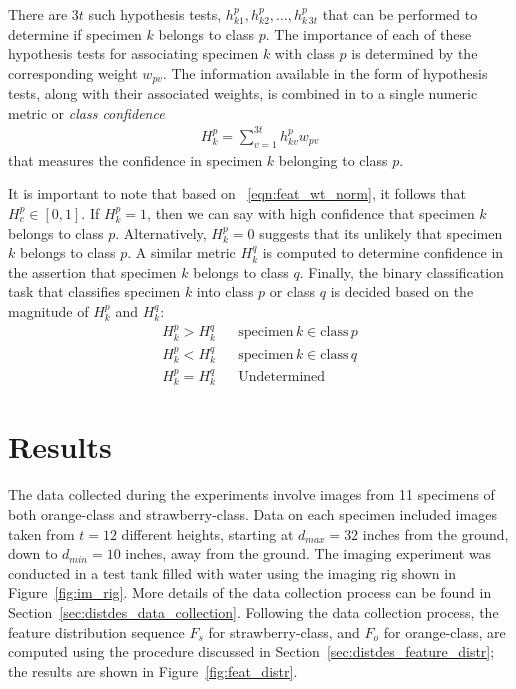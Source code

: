 There are $3t$ such hypothesis tests, $h^p_{k1}, h^p_{k2},\ldots, h^p_{k\, 3t}$ that can be performed to determine if specimen $k$ belongs to class $p$.
The importance of each of these hypothesis tests for associating specimen $k$ with class $p$ is determined by the corresponding weight $w_{pv}$. The information available in the form of hypothesis tests, along with their associated weights, is combined in to a single numeric metric or \emph{class confidence} 
%
\begin{align} \label{eqn:numeric_class_metric}
 H^p_k=\sum_{v=1}^{3t} h^p_{kv} w_{pv} 
\end{align}
%
that measures the confidence in specimen $k$ belonging to class $p$.

It is important to note that based on ~\eqref{eqn:feat_wt_norm}, it follows that $H^p_c\in[0,1]$. If $H^p_k=1$, then we can say with high confidence that specimen $k$ belongs to class $p$. Alternatively, $H^p_k=0$ suggests that its unlikely that specimen $k$ belongs to class $p$. A similar metric $H^q_k$ is computed to determine confidence in the assertion that
specimen $k$ belongs to class $q$. Finally, the binary classification task that classifies specimen $k$ into class $p$ or class $q$ is decided based on the magnitude of $H^p_k$ and $H^q_k$:
%
\begin{align}	\label{eqn:binary_classification}
 H^p_k > H^q_k	&{} &\text{specimen}\, k \in \text{class}\, p\nonumber\\
 H^p_k < H^q_k	&{} &\text{specimen}\, k \in \text{class}\, q\nonumber\\
 H^p_k = H^q_k	&{} &\text{Undetermined}
\end{align}


\section{Results}

The data collected during the experiments involve images from 11 specimens of both orange-class and strawberry-class. Data on each specimen included images taken from $t=12$ different heights, starting at $d_{max}=32$ inches from the ground, down to $d_{min}=10$ inches, away from the ground. The imaging experiment was conducted in a test tank filled with water using the imaging rig shown in Figure~\ref{fig:im_rig}. More details of the data collection process can be found in Section~\ref{sec:distdes_data_collection}. Following the data collection process, the feature distribution sequence $F_{s}$ for strawberry-class, and $F_{o}$  for orange-class, are computed using the procedure discussed in Section~\ref{sec:distdes_feature_distr}; the results are shown in Figure~\ref{fig:feat_distr}.

